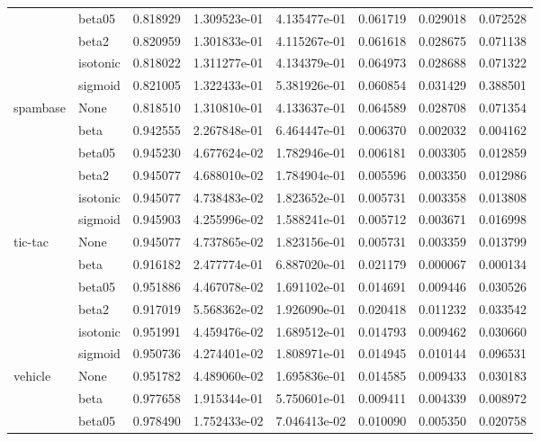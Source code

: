 \begin{tabular}{llrrrrrr}
        & beta05 &  0.818929 &  1.309523e-01 &  4.135477e-01 &  0.061719 &  0.029018 &  0.072528 \\
        & beta2 &  0.820959 &  1.301833e-01 &  4.115267e-01 &  0.061618 &  0.028675 &  0.071138 \\
        & isotonic &  0.818022 &  1.311277e-01 &  4.134379e-01 &  0.064973 &  0.028688 &  0.071322 \\
        & sigmoid &  0.821005 &  1.322433e-01 &  5.381926e-01 &  0.060854 &  0.031429 &  0.388501 \\
spambase & None &  0.818510 &  1.310810e-01 &  4.133637e-01 &  0.064589 &  0.028708 &  0.071354 \\
        & beta &  0.942555 &  2.267848e-01 &  6.464447e-01 &  0.006370 &  0.002032 &  0.004162 \\
        & beta05 &  0.945230 &  4.677624e-02 &  1.782946e-01 &  0.006181 &  0.003305 &  0.012859 \\
        & beta2 &  0.945077 &  4.688010e-02 &  1.784904e-01 &  0.005596 &  0.003350 &  0.012986 \\
        & isotonic &  0.945077 &  4.738483e-02 &  1.823652e-01 &  0.005731 &  0.003358 &  0.013808 \\
        & sigmoid &  0.945903 &  4.255996e-02 &  1.588241e-01 &  0.005712 &  0.003671 &  0.016998 \\
tic-tac & None &  0.945077 &  4.737865e-02 &  1.823156e-01 &  0.005731 &  0.003359 &  0.013799 \\
        & beta &  0.916182 &  2.477774e-01 &  6.887020e-01 &  0.021179 &  0.000067 &  0.000134 \\
        & beta05 &  0.951886 &  4.467078e-02 &  1.691102e-01 &  0.014691 &  0.009446 &  0.030526 \\
        & beta2 &  0.917019 &  5.568362e-02 &  1.926090e-01 &  0.020418 &  0.011232 &  0.033542 \\
        & isotonic &  0.951991 &  4.459476e-02 &  1.689512e-01 &  0.014793 &  0.009462 &  0.030660 \\
        & sigmoid &  0.950736 &  4.274401e-02 &  1.808971e-01 &  0.014945 &  0.010144 &  0.096531 \\
vehicle & None &  0.951782 &  4.489060e-02 &  1.695836e-01 &  0.014585 &  0.009433 &  0.030183 \\
        & beta &  0.977658 &  1.915344e-01 &  5.750601e-01 &  0.009411 &  0.004339 &  0.008972 \\
        & beta05 &  0.978490 &  1.752433e-02 &  7.046413e-02 &  0.010090 &  0.005350 &  0.020758 \\

\end{tabular}
